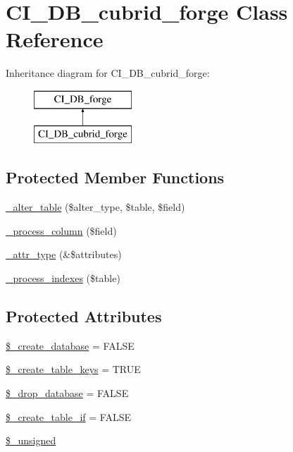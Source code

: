 \hypertarget{class_c_i___d_b__cubrid__forge}{}\section{C\+I\+\_\+\+D\+B\+\_\+cubrid\+\_\+forge Class Reference}
\label{class_c_i___d_b__cubrid__forge}
Inheritance diagram for C\+I\+\_\+\+D\+B\+\_\+cubrid\+\_\+forge\+:\begin{figure}[H]
\begin{center}
\leavevmode
\includegraphics[height=2.000000cm]{class_c_i___d_b__cubrid__forge}
\end{center}
\end{figure}
\subsection*{Protected Member Functions}
\begin{DoxyCompactItemize}
\item 
\mbox{\hyperlink{class_c_i___d_b__cubrid__forge_a41c6cae02f2fda8b429ad0afb9509426}{\+\_\+alter\+\_\+table}} (\$alter\+\_\+type, \$table, \$field)
\item 
\mbox{\hyperlink{class_c_i___d_b__cubrid__forge_a8f38f1c5b5dddecca4befbe393f3f299}{\+\_\+process\+\_\+column}} (\$field)
\item 
\mbox{\hyperlink{class_c_i___d_b__cubrid__forge_a8553be952084c6f7cdfff370a1d14f6b}{\+\_\+attr\+\_\+type}} (\&\$attributes)
\item 
\mbox{\hyperlink{class_c_i___d_b__cubrid__forge_ae0bdb4ea3418590d1894c5b621b5ca50}{\+\_\+process\+\_\+indexes}} (\$table)
\end{DoxyCompactItemize}
\subsection*{Protected Attributes}
\begin{DoxyCompactItemize}
\item 
\mbox{\hyperlink{class_c_i___d_b__cubrid__forge_acd23c9a8735806155f1a5d0a87c151f2}{\$\+\_\+create\+\_\+database}} = F\+A\+L\+SE
\item 
\mbox{\hyperlink{class_c_i___d_b__cubrid__forge_a73e07acdd35c948ad353903c2827af6e}{\$\+\_\+create\+\_\+table\+\_\+keys}} = T\+R\+UE
\item 
\mbox{\hyperlink{class_c_i___d_b__cubrid__forge_a8305b12fc17f6f87778260ebdff287b4}{\$\+\_\+drop\+\_\+database}} = F\+A\+L\+SE
\item 
\mbox{\hyperlink{class_c_i___d_b__cubrid__forge_a2f6484fcb8d1dc3eef67a637227cd583}{\$\+\_\+create\+\_\+table\+\_\+if}} = F\+A\+L\+SE
\item 
\mbox{\hyperlink{class_c_i___d_b__cubrid__forge_aae977ae6d61fa183f0b25422b6ddc31c}{\$\+\_\+unsigned}}
\end{DoxyCompactItemize}
